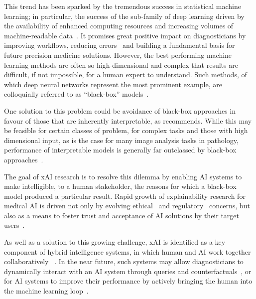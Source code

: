 This trend has been sparked by the tremendous success in statistical machine learning; in particular, the success of the sub-family of deep learning driven by the availability of enhanced computing resources and increasing volumes of machine-readable data~\cite{LeCunBengioHinton:2015:DeepLearningNature}. It promises great positive impact on diagnosticians by improving workflows, reducing errors~\cite{Topol:2019:NatureMedicine} and building a fundamental basis for future precision medicine solutions. However, the best performing machine learning methods are often so high-dimensional and complex that results are difficult, if not impossible, for a human expert to understand. Such methods, of which deep neural networks represent the most prominent example, are colloquially referred to as ``black-box'' models~\cite{Castelvecchi:2016:OpenBlack}.

One solution to this problem could be avoidance of black-box approaches in favour of those that are inherently interpretable, as \citet{Rudin:2019:interpretable} recommends. While this may be feasible for certain classes of problem, for complex tasks and those with high dimensional input, as is the case for many image analysis tasks in pathology, performance of interpretable models is generally far outclassed by black-box approaches~\cite{arrieta2020explainable, Holzinger:2020:explainable}.

The goal of xAI research is to resolve this dilemma by enabling AI systems to make intelligible, to a human stakeholder, the reasons for which a black-box model produced a particular result. Rapid growth of explainability research for medical AI is driven not only by evolving ethical~\cite{MuellerEtAl:2021:TenCommandments} and regulatory~\cite{Schneeberger:2020:legalAI} concerns, but also as a means to foster trust and acceptance of AI solutions by their target users~\cite{GuidottiPedreschi:2019:Survey, ProsperiEtAl:2020:CausalHealth, Ferrario:trustmedicalai, gaube:trustmedicalai:2021, kastner2021relation}.

As well as a solution to this growing challenge, xAI is identified as a key component of hybrid intelligence systems, in which human and AI work together collaboratively ~\cite{hemmer2021human}. In the near future, such systems may allow diagnosticians to dynamically interact with an AI system through queries and counterfactuals~\cite{HolzingerEtAl:2021:GraphFusion}, or for AI systems to improve their performance by actively bringing the human into the machine learning loop~\cite{Holzinger:2020:explainable}.

